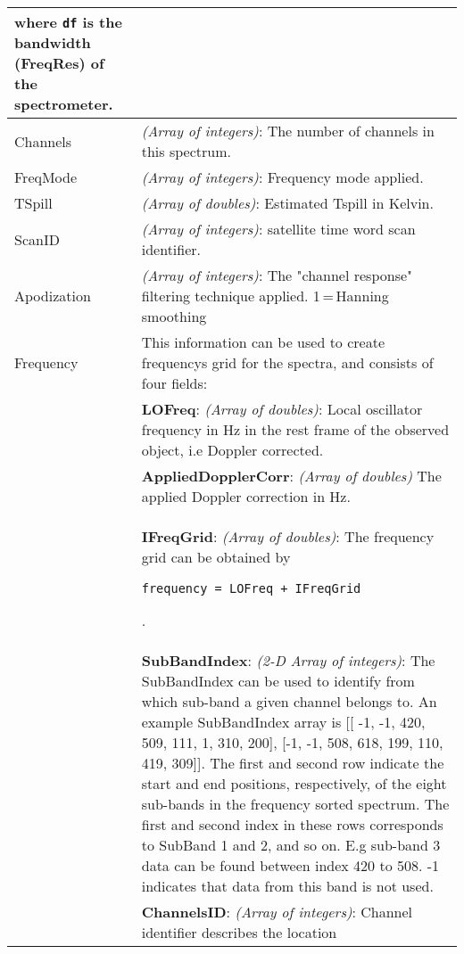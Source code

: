 \begin{longtable}{| p{} | p{} |}
                         where {\tt df} is the bandwidth (FreqRes) of the spectrometer.\\ \hline
     Channels        & \emph{(Array of integers)}: The number of channels in this spectrum.\\ \hline
     FreqMode        & \emph{(Array of integers)}: Frequency mode applied.\\ \hline
     TSpill          & \emph{(Array of doubles)}: Estimated Tspill in Kelvin. \\ \hline
     ScanID          & \emph{(Array of integers)}: satellite time word scan identifier.\\ \hline
     Apodization     & \emph{(Array of integers)}: The "channel response" filtering technique applied. 1\,=\,Hanning smoothing \\ \hline 
     Frequency       & This information can be used to create frequencys grid for the spectra,
                       and consists of four fields: \\
                     & \textbf{LOFreq}: \emph{(Array of doubles)}: Local oscillator frequency in Hz in the rest frame of the
                       observed object, i.e Doppler corrected. \\
                     & \textbf{AppliedDopplerCorr}: \emph{(Array of doubles)} The applied Doppler correction in Hz.\\
                     & \textbf{IFreqGrid}: \emph{(Array of doubles)}: The frequency grid can be obtained by
                       \begin{verbatim}frequency = LOFreq + IFreqGrid\end{verbatim}.   \\
                     & \textbf{SubBandIndex}: \emph{(2-D Array of integers)}: The SubBandIndex 
                       can be used to identify from which sub-band a given channel belongs to.
                       An example SubBandIndex array is [[ -1, -1, 420, 509, 111, 1, 310, 200],
                       [-1, -1, 508, 618, 199, 110, 419, 309]].
                       The first and second row indicate the start and end positions, respectively,
                       of the eight sub-bands in the frequency sorted spectrum.
                       The first and second index in these rows corresponds to SubBand 1 and 2, and so
                       on. E.g sub-band 3 data can be found between index 420 to 508.
                       -1 indicates that data from this band is not used. \\
                     & \textbf{ChannelsID}: \emph{(Array of integers)}: Channel identifier describes the location

\end{longtable}

